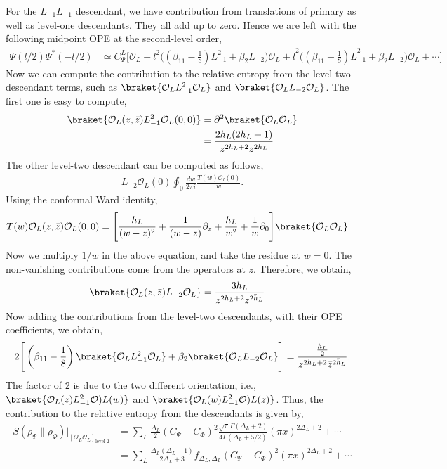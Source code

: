 \documentclass[11pt]{article}
\newcommand{\p}{\partial}
\newcommand{\mO}{\mathcal{O}}
\newcommand{\lb}{\left(}
\newcommand{\rb}{\right)}
\begin{document}
For the $L_{-1}\bar L_{-1}$ descendant, we have contribution from translations of primary as well as level-one descendants. They all add up to zero. Hence we are left with the following midpoint OPE at the second-level order,
\begin{align}
    \Psi(l/2)\Psi^*(-l/2) &\simeq C_\Psi^L \Bigg[ \mO_L + l^2 \Bigg( \lb \beta_{11}-\frac{1}{8}\rb L_{-1}^2 + \beta_2L_{-2}\Bigg)\mO_L + \bar l^2 \Bigg( \lb \bar \beta_{11}-\frac{1}{8}\rb \bar L_{-1}^2 + \bar \beta_2\bar L_{-2}\Bigg)\mO_L + \cdots\Bigg] 
\end{align}
Now we can compute the contribution to the relative entropy from the level-two descendant terms, such as $\braket{\mO_L L_{-1}^2\mO_L}$ and $\braket{\mO_L L_{-2}\mO_L}$. The first one is easy to compute,
\begin{align}
    \braket{\mO_L(z,\bar z) L_{-1}^2\mO_L(0,0)} &= \p^2 \braket{\mO_L\mO_L} 
    \\
    &=\frac{2h_L (2h_L+1)}{z^{2h_L+2} \bar z^{2\bar h_L }}
\end{align}
The other level-two descendant can be computed as follows,
\begin{align}
    L_{-2}\mO_L (0) \oint_0 \frac{dw}{2\pi i } \frac{T(w)\mO_l(0)}{w}.
\end{align}
Using the conformal Ward identity,
\begin{align}
    T(w)\mO_L(z,\bar z)\mO_L(0,0) &= \Bigg[ \frac{h_L}{(w-z)^2}+ \frac{1}{(w-z)}\p_z + \frac{h_L}{w^2} + \frac{1}{w}\p_0 \Bigg]\braket{\mO_L\mO_L}
\end{align}
Now we multiply $1/w$ in the above equation, and take the residue at $w=0$. The non-vanishing contributions come from the operators at $z$. Therefore, we obtain,
\begin{align}
    \braket{\mO_L (z,\bar z) L_{-2}\mO_L} &= \frac{3h_L}{z^{2h_L + 2}\bar z ^{2\bar h_L}}
\end{align}
Now adding the contributions from the level-two descendants, with their OPE coefficients, we obtain,
\begin{align}
    2 \Bigg[ \lb \beta_{11}-\frac{1}{8} \rb\braket{\mO_L L_{-1}^2\mO_L} + \beta_2 \braket{\mO_L L_{-2}\mO_L}\Bigg] = \frac{\frac{h_L}{2}}{z^{2h_L+2}\bar z^{2\bar h_L}}.
\end{align}
The factor of 2 is due to the two different orientation, i.e., $\braket{\mO_L(z)L_{-1}^2\mO)L(w)}$ and $\braket{\mO_L(w)L_{-1}^2\mO)L(z)}$. Thus, the contribution to the relative entropy from the descendants is given by,
\begin{align}
    S(\rho_\Psi \|\rho_\Phi) \Big|_{[\mO_L\mO_L]_{\text{level-2}}} &= \sum_L \frac{\Delta_L}{2}(C_\Psi - C_\Phi)^2 \frac{\sqrt \pi \Gamma(\Delta_L + 2)}{4\Gamma(\Delta_L + 5/2)}(\pi x)^{2\Delta_L + 2} + \cdots\\
    &= \sum_L \frac{\Delta_L (\Delta_L + 1)}{2\Delta_L + 3} f_{\Delta_L,\Delta_L}(C_\Psi - C_\Phi)^2(\pi x)^{2\Delta_L + 2} + \cdots
\end{align}
\end{document}
